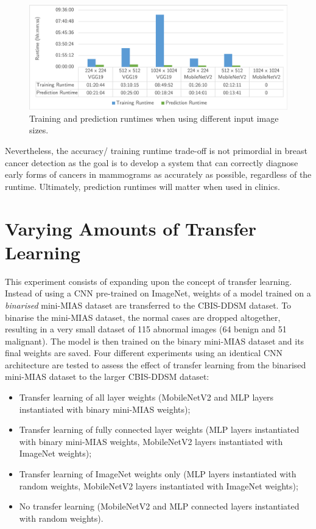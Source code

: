 \begin{figure}[H]
\centerline{\includegraphics[width=\textwidth]{figures/evaluation/image_size_experiment/runtimes.png}}
\caption{\label{fig:evaluation-image_size_experiment-runtimes}Training and prediction runtimes when using different input image sizes.}
\end{figure}

Nevertheless, the accuracy/ training runtime trade-off is not primordial in breast cancer detection as the goal is to develop a system that can correctly diagnose early forms of cancers in mammograms as accurately as possible, regardless of the runtime. Ultimately, prediction runtimes will matter when used in clinics.


\section{Varying Amounts of Transfer Learning}
\label{sec:evaluation-transfer-learning}

This experiment consists of expanding upon the concept of transfer learning. Instead of using a CNN pre-trained on ImageNet, weights of a model trained on a \textit{binarised} mini-MIAS dataset are transferred to the CBIS-DDSM dataset. To binarise the mini-MIAS dataset, the normal cases are dropped altogether, resulting in a very small dataset of 115 abnormal images (64 benign and 51 malignant). The model is then trained on the binary mini-MIAS dataset and its final weights are saved. Four different experiments using an identical CNN architecture are tested to assess the effect of transfer learning from the binarised mini-MIAS dataset to the larger CBIS-DDSM dataset:
\begin{itemize}
    \item Transfer learning of all layer weights (MobileNetV2 and MLP layers instantiated with binary mini-MIAS weights);
    \item Transfer learning of fully connected layer weights (MLP layers instantiated with binary mini-MIAS weights, MobileNetV2 layers instantiated with ImageNet weights);
    \item Transfer learning of ImageNet weights only (MLP layers instantiated with random weights, MobileNetV2 layers instantiated with ImageNet weights);
    \item No transfer learning (MobileNetV2 and MLP connected layers instantiated with random weights).
\end{itemize}

